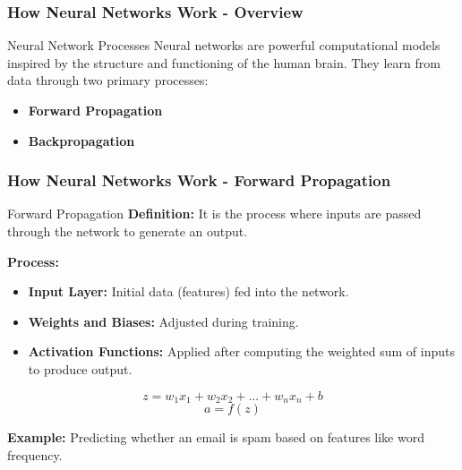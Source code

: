 \documentclass[aspectratio=169]{beamer}
\begin{document}
\begin{frame}[fragile]
    \frametitle{How Neural Networks Work - Overview}
    \begin{block}{Neural Network Processes}
        Neural networks are powerful computational models inspired by the structure and functioning of the human brain. They learn from data through two primary processes:
        \begin{itemize}
            \item \textbf{Forward Propagation}
            \item \textbf{Backpropagation}
        \end{itemize}
    \end{block}
\end{frame}

\begin{frame}[fragile]
    \frametitle{How Neural Networks Work - Forward Propagation}
    \begin{block}{Forward Propagation}
        \textbf{Definition:} It is the process where inputs are passed through the network to generate an output.

        \textbf{Process:}
        \begin{itemize}
            \item \textbf{Input Layer:} Initial data (features) fed into the network.
            \item \textbf{Weights and Biases:} Adjusted during training.
            \item \textbf{Activation Functions:} Applied after computing the weighted sum of inputs to produce output.
        \end{itemize}
    \end{block}

    \begin{equation}
        z = w_1x_1 + w_2x_2 + ... + w_nx_n + b
    \end{equation}
    \begin{equation}
        a = f(z)
    \end{equation}

    \textbf{Example:} Predicting whether an email is spam based on features like word frequency.
\end{frame}
\end{document}
